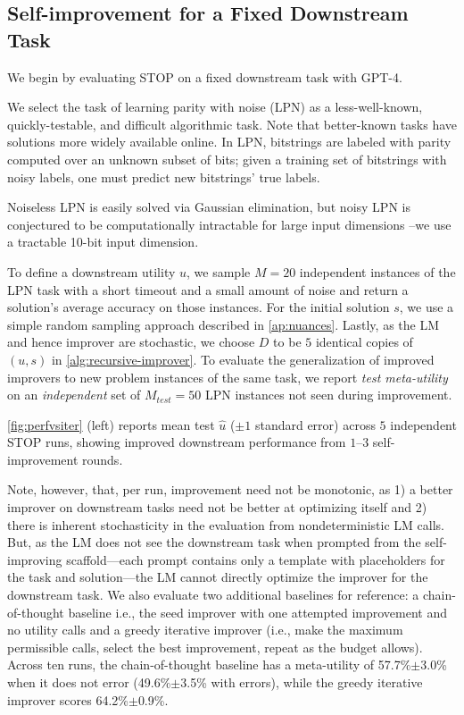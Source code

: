 \documentclass{article}
\newcommand{\metautil}{{\hat{u}}}
\newcommand{\sol}{{s}}
\begin{document}
\subsection{Self-improvement for a Fixed Downstream Task}\label{sec:fixed} 

We begin by evaluating STOP on a fixed downstream task with GPT-4.




We select the task of learning parity with noise (LPN) \citep{blum2000noise} as a less-well-known, quickly-testable, and difficult algorithmic task. Note that better-known tasks have solutions more widely available online.
In LPN, bitstrings are labeled with parity computed over an unknown subset of bits; given a training set of bitstrings with noisy labels, one must predict new bitstrings' true labels. 

Noiseless LPN is easily solved via Gaussian elimination, but noisy LPN is conjectured to be computationally intractable for large input dimensions \citep{blum2000noise}--we use a tractable 10-bit input dimension. 

To define a downstream utility $u$, we sample $M=20$ independent instances of the LPN task with a short timeout and a small amount of noise and return a solution's average accuracy on those instances. For the initial solution $\sol$, we use a simple random sampling approach described in \cref{ap:nuances}. Lastly, as the LM and hence improver are stochastic, we choose $D$ to be $5$ identical copies of $(u,\sol)$ in \cref{alg:recursive-improver}. To evaluate the generalization of improved improvers to new problem instances of the same task, we report \emph{test meta-utility} on an \emph{independent} set of $M_{test}=50$ LPN instances not seen during improvement.\vspace{-2px}



\cref{fig:perfvsiter} (left) reports mean test $\metautil$ ($\pm 1$ standard error) across $5$ independent STOP runs, 
showing improved downstream performance from $1$--$3$ self-improvement rounds.

Note, however, that, per run, improvement need not be monotonic, as 1) a better improver on downstream tasks need not be better at optimizing itself and 2) there is inherent stochasticity in the evaluation from nondeterministic LM calls. But, as the LM does not see the downstream task when prompted from the self-improving scaffold---each prompt contains only a template with placeholders for the task and solution---the LM cannot directly optimize the improver for the downstream task. We also evaluate two additional baselines for reference: a chain-of-thought baseline i.e., the seed improver with one attempted improvement and no utility calls \citep{wei_chain_2022}  and a greedy iterative improver (i.e., make the maximum permissible calls, select the best improvement, repeat as the budget allows). Across ten runs, the chain-of-thought baseline has a meta-utility of 57.7\%$\pm$3.0\% when it does not error (49.6\%$\pm$3.5\% with errors), while the greedy iterative improver scores 64.2\%$\pm$0.9\%. \vspace{-1px}
\end{document}
